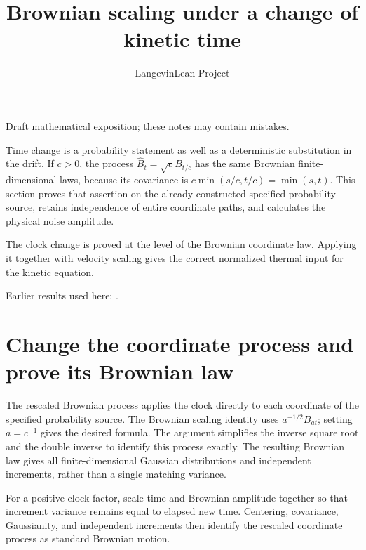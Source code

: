 \documentclass[11pt,a4paper]{article}
\title{\texorpdfstring{Brownian scaling under a change of kinetic time}{Brownian scaling under a change of kinetic time}}
\author{LangevinLean Project}
\date{}
\begin{document}
\maketitle
Draft mathematical exposition; these notes may contain mistakes.


Time change is a probability statement as well as a deterministic substitution in the drift. If \(c>0\), the process \(\widehat B_t=\sqrt c B_{t/c}\) has the same Brownian finite-dimensional laws, because its covariance is \(c\min(s/c,t/c)=\min(s,t)\). This section proves that assertion on the already constructed specified probability source, retains independence of entire coordinate paths, and calculates the physical noise amplitude.



The clock change is proved at the level of the Brownian coordinate law. Applying it together with velocity scaling gives the correct normalized thermal input for the kinetic equation.



Earlier results used here: \cite[Section~3.8]{LangevinLean2026ULASC}.

\section{\texorpdfstring{Change the coordinate process and prove its Brownian law}{Change the coordinate process and prove its Brownian law}}


The rescaled Brownian process applies the clock directly to each coordinate of the specified probability source. The Brownian scaling identity uses \(a^{-1/2}B_{at}\); setting \(a=c^{-1}\) gives the desired formula. The argument simplifies the inverse square root and the double inverse to identify this process exactly. The resulting Brownian law gives all finite-dimensional Gaussian distributions and independent increments, rather than a single matching variance.



For a positive clock factor, scale time and Brownian amplitude together so that increment variance remains equal to elapsed new time. Centering, covariance, Gaussianity, and independent increments then identify the rescaled coordinate process as standard Brownian motion.
\end{document}

